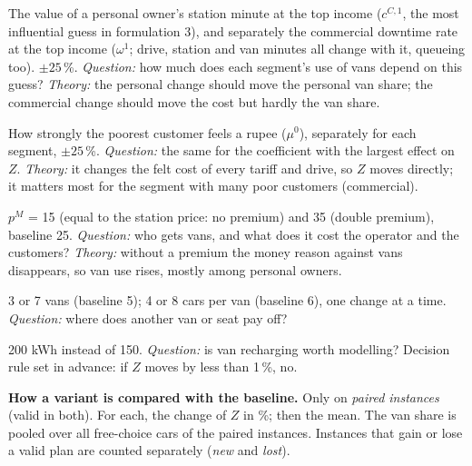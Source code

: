 \begin{table}[H]
\centering
\caption{The 15 variants of the five experiments.}

\end{table}

\begin{description}[leftmargin=1em]
  \item[E5 Value of charging time.] The value of a personal owner's station minute at the top income ($c^{C,1}$, the most influential guess in formulation 3), and separately the commercial downtime rate at the top income ($\omega^1$; drive, station and van minutes all change with it, queueing too). $\pm25$\,\%. \emph{Question:} how much does each segment's use of vans depend on this guess? \emph{Theory:} the personal change should move the personal van share; the commercial change should move the cost but hardly the van share.
  \item[E6 Money sensitivity.] How strongly the poorest customer feels a rupee ($\mu^0$), separately for each segment, $\pm25$\,\%. \emph{Question:} the same for the coefficient with the largest effect on $Z$. \emph{Theory:} it changes the felt cost of every tariff and drive, so $Z$ moves directly; it matters most for the segment with many poor customers (commercial).
  \item[E1 Van tariff.] $p^M$ = 15 (equal to the station price: no premium) and 35 (double premium), baseline 25. \emph{Question:} who gets vans, and what does it cost the operator and the customers? \emph{Theory:} without a premium the money reason against vans disappears, so van use rises, mostly among personal owners.
  \item[E2 Van fleet and seats.] 3 or 7 vans (baseline 5); 4 or 8 cars per van (baseline 6), one change at a time. \emph{Question:} where does another van or seat pay off?
  \item[E8 Van battery.] 200 kWh instead of 150. \emph{Question:} is van recharging worth modelling? Decision rule set in advance: if $Z$ moves by less than 1\,\%, no.
\end{description}

\textbf{How a variant is compared with the baseline.} Only on \emph{paired instances} (valid in both). For each, the change of $Z$ in \%; then the mean. The van share is pooled over all free-choice cars of the paired instances. Instances that gain or lose a valid plan are counted separately (\emph{new} and \emph{lost}).

